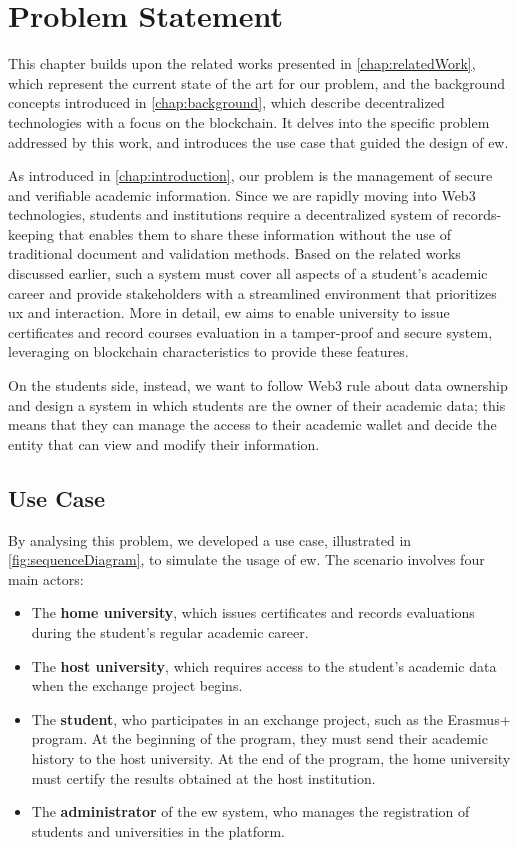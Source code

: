\chapter{Problem Statement}
\label{chap:problemStatement}
This chapter builds upon the related works presented in \cref{chap:relatedWork}, which represent the current state of the art for our problem, and the background concepts introduced in \cref{chap:background}, which describe decentralized technologies with a focus on the blockchain. It delves into the specific problem addressed by this work, and introduces the use case that guided the design of \gls{ew}.

As introduced in \cref{chap:introduction}, our problem is the management of secure and verifiable academic information. Since we are rapidly moving into Web3 technologies, students and institutions require a decentralized system of records-keeping that enables them to share these information without the use of traditional document and validation methods. Based on the related works discussed earlier, such a system must cover all aspects of a student's academic career and provide stakeholders with a streamlined environment that prioritizes \gls{ux} and interaction. More in detail, \gls{ew} aims to enable university to issue certificates and record courses evaluation in a tamper-proof and secure system, leveraging on blockchain characteristics to provide these features. 

On the students side, instead, we want to follow Web3 rule about data ownership and design a system in which students are the owner of their academic data; this means that they can manage the access to their academic wallet and decide the entity that can view and modify their information.

\section{Use Case}
By analysing this problem, we developed a use case, illustrated in \cref{fig:sequenceDiagram}, to simulate the usage of \gls{ew}. The scenario involves four main actors:
\begin{itemize}
    \item The \textbf{home university}, which issues certificates and records evaluations during the student's regular academic career.
    \item The \textbf{host university}, which requires access to the student's academic data when the exchange project begins.
    \item The \textbf{student}, who participates in an exchange project, such as the Erasmus+ program. At the beginning of the program, they must send their academic history to the host university. At the end of the program, the home university must certify the results obtained at the host institution.
    \item The \textbf{administrator} of the \gls{ew} system, who manages the registration of students and universities in the platform.
\end{itemize}

